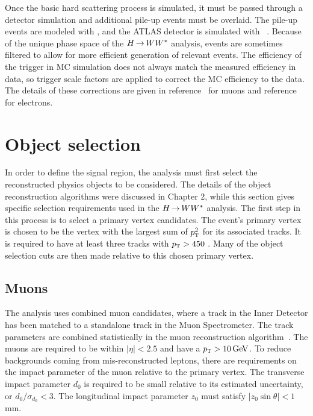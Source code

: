 Once the basic hard scattering process is simulated, it must be passed through a detector simulation and additional pile-up events must be overlaid. The pile-up events are modeled with , and the ATLAS detector is simulated with ~\cite{geant4}. Because of the unique phase space of the $H{\,{\rightarrow}\,}WW^\ast$ analysis, events are sometimes filtered to allow for more efficient generation of relevant events. The efficiency of the trigger in MC simulation does not always match the measured efficiency in data, so trigger scale factors are applied to correct the MC efficiency to the data. The details of these corrections are given in reference~\cite{MuonTrigger2012} for muons and reference~\cite{ElectronTrigger2012} for electrons.

\section{Object selection}

In order to define the signal region, the analysis must first select the reconstructed physics objects to be considered. The details of the object reconstruction algorithms were discussed in Chapter 2, while this section gives specific selection requirements used in the $H{\,{\rightarrow}\,}WW^\ast$ analysis. The first step in this process is to select a primary vertex candidates. The event's primary vertex is chosen to be the vertex with the largest sum of $p_{\textrm{\footnotesize\sc t}}^2$ for its associated tracks. It is required to have at least three tracks with $p_{\textrm{\footnotesize\sc t}} > 450$ \MeV. Many of the object selection cuts are then made relative to this chosen primary vertex.

\subsection{Muons}

The analysis uses combined muon candidates, where a track in the Inner Detector has been matched to a standalone track in the Muon Spectrometer. The track parameters are combined statistically in the muon reconstruction algorithm~\cite{MuonReco}. The muons are required to be within $|\eta| < 2.5$ and have a $\pT > 10 \GeV$. To reduce backgrounds coming from mis-reconstructed leptons, there are requirements on the impact parameter of the muon relative to the primary vertex. The transverse impact parameter $d_0$ is required to be small relative to its estimated uncertainty, or $d_0/\sigma_{d_0} < 3$. The longitudinal impact parameter $z_0$ must satisfy $\left|z_0\sin\theta\right| < 1$ mm. 

